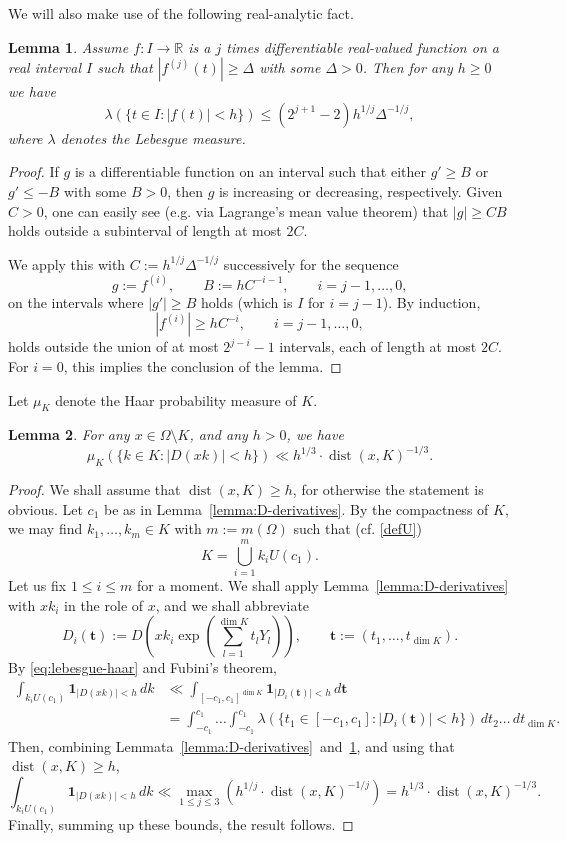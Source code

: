 \documentclass[11pt,oneside]{amsart}
\numberwithin{equation}{section}
\theoremstyle{remark}
\theoremstyle{plain}
\newtheorem{lemma}{Lemma}
\DeclareMathOperator{\dist}{dist}
\newcommand\RR{\mathbb{R}}
\newcommand{\bt}{\mathbf{t}}
\renewcommand\leq{\leqslant}
\renewcommand\geq{\geqslant}
\begin{document}
We will also make use of the following real-analytic fact.
\begin{lemma}\label{lemma:from-real-analysis} Assume $f:I\to\RR$ is a $j$ times differentiable real-valued function on a real interval $I$ such that $|f^{(j)}(t)|\geq \Delta$ with some $\Delta>0$. Then for any $h\geq 0$ we have 
\[
\lambda(\{t\in I: |f(t)| < h \}) \leq (2^{j+1}-2) h^{1/j} \Delta^{-1/j},
\]
where $\lambda$ denotes the Lebesgue measure.
\end{lemma}
\begin{proof} If $g$ is a differentiable function on an interval such that either $g'\geq B$ or $g'\leq -B$ with some $B>0$, then $g$ is increasing or decreasing, respectively. Given $C > 0$, one can easily see (e.g. via Lagrange's mean value theorem) that $|g|\geq CB$ holds outside a subinterval of length at most $2C$.

We apply this with $C:=h^{1/j} \Delta^{-1/j}$ successively for the sequence
\[
g:=f^{(i)},\qquad B:=h C^{-i-1}, \qquad i=j-1,\dotsc,0,
\]
on the intervals where $|g'|\geq B$ holds (which is $I$ for $i=j-1$). By induction,
\[
|f^{(i)}|\geq h C^{-i}, \qquad i=j-1,\dotsc,0,
\]
holds outside the union of at most $2^{j-i}-1$ intervals, each of length at most $2C$. For $i=0$, this implies the conclusion of the lemma.
\end{proof}

Let $\mu_K$ denote the Haar probability measure of $K$.
\begin{lemma}\label{lemma:D-is-often-large} For any $x\in\Omega\setminus K$, and any $h>0$, we have
\[
\mu_K\left(\{k\in K: |D(xk)| < h\}\right) \ll h^{1/3} \cdot \dist(x,K)^{-1/3}.
\]
\end{lemma}
\begin{proof} We shall assume that $\dist(x,K)\geq h$, for otherwise the statement is obvious. Let $c_1$ be as in Lemma~\ref{lemma:D-derivatives}. By the compactness of $K$, we may find $k_1,\dotsc,k_m\in K$ with $m:=m(\Omega)$ such that (cf. \eqref{defU})
\[
K=\bigcup_{i=1}^m k_i U(c_1).
\]
Let us fix $1\leq i\leq m$ for a moment. We shall apply Lemma~\ref{lemma:D-derivatives} with $xk_i$ in the role of $x$, and we shall abbreviate
\[
D_i(\bt):=D\left(xk_i \exp\left(\sum_{l=1}^{\dim K} t_l Y_l\right)\right),\qquad \bt:=(t_1,\dotsc,t_{\dim K}).
\]
By \eqref{eq:lebesgue-haar} and Fubini's theorem,
\begin{align*}
\int_{k_i U(c_1)} \mathbf{1}_{|D(xk)|<h}\,dk & \ll \int_{[-c_1,c_1]^{\dim K}} \mathbf{1}_{|D_i(\bt)|<h}\, d\bt \\ & = \int_{-c_1}^{c_1} \dotsc \int_{-c_1}^{c_1} \lambda(\{t_1\in[-c_1,c_1]:|D_i(\bt)|<h\})\, dt_2 \dotsc \, dt_{\dim K}.
\end{align*}
Then, combining Lemmata~\ref{lemma:D-derivatives}~and~\ref{lemma:from-real-analysis}, and using that $\dist(x,K)\geq h$,
\[
\int_{k_i U(c_1)} \mathbf{1}_{|D(xk)|<h}\,dk \ll \max_{1\leq j\leq 3} \left(h^{1/j} \cdot \dist(x,K)^{-1/j}\right) = h^{1/3} \cdot \dist(x,K)^{-1/3}.
\]
Finally, summing up these bounds, the result follows.
\end{proof}
\end{document}
